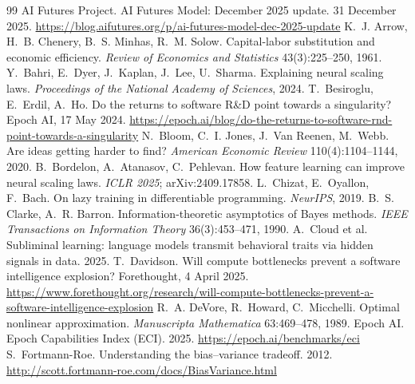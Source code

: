 \begin{thebibliography}{99}
\small
{} AI Futures Project. AI Futures Model: December 2025 update. 31 December 2025. \url{https://blog.aifutures.org/p/ai-futures-model-dec-2025-update}
 K.~J. Arrow, H.~B. Chenery, B.~S. Minhas, R.~M. Solow. Capital-labor substitution and economic efficiency. \emph{Review of Economics and Statistics} 43(3):225--250, 1961.
 Y.~Bahri, E.~Dyer, J.~Kaplan, J.~Lee, U.~Sharma. Explaining neural scaling laws. \emph{Proceedings of the National Academy of Sciences}, 2024.
 T.~Besiroglu, E.~Erdil, A.~Ho. Do the returns to software R\&D point towards a singularity? Epoch AI, 17 May 2024. \url{https://epoch.ai/blog/do-the-returns-to-software-rnd-point-towards-a-singularity}
 N.~Bloom, C.~I. Jones, J.~Van Reenen, M.~Webb. Are ideas getting harder to find? \emph{American Economic Review} 110(4):1104--1144, 2020.
 B.~Bordelon, A.~Atanasov, C.~Pehlevan. How feature learning can improve neural scaling laws. \emph{ICLR 2025}; arXiv:2409.17858.
 L.~Chizat, E.~Oyallon, F.~Bach. On lazy training in differentiable programming. \emph{NeurIPS}, 2019.
 B.~S. Clarke, A.~R. Barron. Information-theoretic asymptotics of Bayes methods. \emph{IEEE Transactions on Information Theory} 36(3):453--471, 1990.
 A.~Cloud et al. Subliminal learning: language models transmit behavioral traits via hidden signals in data. 2025.
 T.~Davidson. Will compute bottlenecks prevent a software intelligence explosion? Forethought, 4 April 2025. \url{https://www.forethought.org/research/will-compute-bottlenecks-prevent-a-software-intelligence-explosion}
 R.~A. DeVore, R.~Howard, C.~Micchelli. Optimal nonlinear approximation. \emph{Manuscripta Mathematica} 63:469--478, 1989.
 Epoch AI. Epoch Capabilities Index (ECI). 2025. \url{https://epoch.ai/benchmarks/eci}
 S.~Fortmann-Roe. Understanding the bias--variance tradeoff. 2012. \url{http://scott.fortmann-roe.com/docs/BiasVariance.html}

\end{thebibliography}
